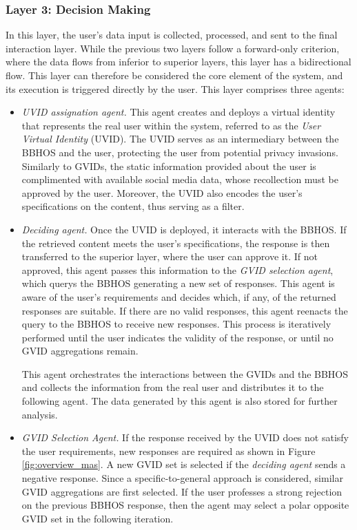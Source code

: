 \subsubsection*{Layer 3: Decision Making}
In this layer, the user's data input is collected, processed, and sent to the final interaction layer. While the previous two layers follow a forward-only criterion, where the data flows from inferior to superior layers, this layer has a bidirectional flow. This layer can therefore be considered the core element of the system, and its execution is triggered directly by the user. This layer comprises three agents:
\begin{itemize}
    \item \textit{UVID assignation agent.} This agent creates and deploys a virtual identity that represents the real user within the system, referred to as the \textit{User Virtual Identity} (UVID). The UVID serves as an intermediary between the BBHOS and the user, protecting the user from potential privacy invasions. Similarly to GVIDs, the static information provided about the user is complimented with available social media data, whose recollection must be approved by the user. Moreover, the UVID also encodes the user's specifications on the content, thus serving as a filter. 
    
    \item \textit{Deciding agent.} Once the UVID is deployed, it interacts with the BBHOS. If the retrieved content meets the user's specifications, the response is then transferred to the superior layer, where the user can approve it. If not approved, this agent passes this information to the \textit{GVID selection agent}, which querys the BBHOS generating a new set of responses. This agent is aware of the user's requirements and decides which, if any, of the returned responses are suitable. If there are no valid responses, this agent reenacts the query to the BBHOS to receive new responses. This process is iteratively performed until the user indicates the validity of the response, or until no GVID aggregations remain.
    
    This agent orchestrates the interactions between the GVIDs and the BBHOS and collects the information from the real user and distributes it to the following agent. The data generated by this agent is also stored for further analysis.
    
    \item \textit{GVID Selection Agent.} If the response received by the UVID does not satisfy the user requirements, new responses are required as shown in Figure \ref{fig:overview_mas}. A new GVID set is selected if the \textit{deciding agent} sends a negative response. Since a specific-to-general approach is considered, similar GVID aggregations are first selected. If the user professes a strong rejection on the previous BBHOS response, then the agent may select a polar opposite GVID set in the following iteration.
    

\end{itemize}
